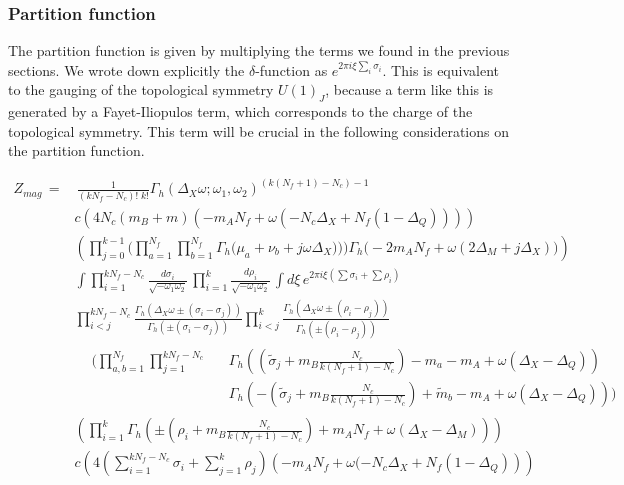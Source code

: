 \subsubsection{Partition function} 
The partition function is given by multiplying the terms we found in the previous sections.
We wrote down explicitly the $\delta$-function as $e^{2\pi i \xi \sum_i \sigma_i}$. 
This is equivalent to the gauging of the topological symmetry $U(1)_J$, because a term like this is generated by a Fayet-Iliopulos term, which corresponds to the charge of the topological symmetry. 
This term will be crucial in the following considerations on the partition function.  

\begin{equation}
\begin{aligned}
Z_{mag}  \,= & \, \frac{1}{ (k N_f - N_c)! \; k!}
 \Gamma_h ( \Delta_X \omega ; \omega_1 , \omega_2)^{(k(N_f+1) - N_c) -1}  \\
 & c \left( 4  N_c(m_B + m)  ( - m_A N_f + \omega( -N_c \Delta_X + N_f ( 1 - \Delta_Q))) \right) \\
 &  \left( \prod_{j=0}^{k-1}
\bigg( \prod_{a=1}^{N_f } \prod_{b=1}^{N_f}  \Gamma_h \big( \mu_a+  \nu_b + j \omega \Delta_X) \big) \bigg) \Gamma_h \big(- 2 m_A N_f +  \omega( 2 {\Delta_M} + j \Delta_X) \big)  \right) \\
&\int  \prod_{i=1}^{ k N_f - N_c } \frac{d \sigma_i }{\sqrt{-\omega_1 \omega_2}}\,  \prod_{i=1}^{ k } \frac{d \rho_i}{\sqrt{-\omega_1 \omega_2}} \, \int d \xi \, e^{2 \pi i \xi ( \sum \sigma_i + \sum \rho_i)}  \\
& \prod_{ i<j}^{k N_f - N_c } \frac{ \Gamma_h( \Delta_X \omega \pm (\sigma_i - \sigma_j)) }{ \Gamma_h ( \pm (\sigma_i - \sigma_j) )} \prod_{ i<j }^{k } \frac{ \Gamma_h( \Delta_X \omega \pm (\rho_i - \rho_j)) }{ \Gamma_h ( \pm (\rho_i - \rho_j) )}\\
& \begin{aligned}
	 & \bigg( \prod_{a,b=1}^{N_f} \prod_{j=1}^{k N_f - N_c } 
			&&  \Gamma_h \left( \left( \tilde{\sigma}_j +  m_B \frac{N_c}{k(N_f+1)-N_c}\right) - m_a - m_A + \omega (\Delta_X - \Delta_Q)   \right) \\
	 &  && \Gamma_h \left(  - \left( \tilde{\sigma}_j +m_B \frac{N_c}{k(N_f+1)-N_c} \right) + \tilde{m}_b - m_A + \omega (\Delta_X - \Delta_Q)  \right) \bigg)
 \end{aligned}\\
 & \left(\prod_{i=1}^{k} \Gamma_h \left( \pm(  \rho_i  + m_B \frac{N_c}{k(N_f+1)-N_c})+ m_A N_f + \omega( \Delta_X - {\Delta_M }) \right) \right)\\
 &c \left( 4 \left(   \sum_{i=1}^{k N_f -N_c} \sigma_i + \sum_{j=1}^{k} \rho_j  \right) \left( - m_A N_f  +  \omega (  - N_c \Delta_X  +N_f (1- \Delta_Q ) \right)  \right)
 \end{aligned}
\end{equation}
